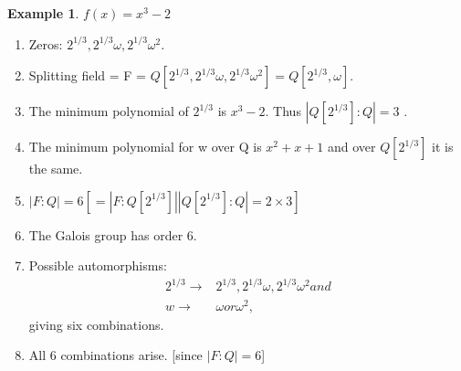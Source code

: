 \documentclass[12pt]{article}
\theoremstyle{definition}
\newtheorem{exmp}[thm]{Example}
\theoremstyle{remark}
\begin{document}
\begin{exmp}
$f(x) = x^{3} - 2$
\begin{enumerate}
  \item  Zeros: $2^{1/3}, 2^{1/3}\omega, 2^{1/3}\omega^{2}$.
  \item  Splitting field = F = $Q[2^{1/3}, 2^{1/3}\omega, 2^{1/3}\omega^{2}] = Q[2^{1/3}, \omega]$.
  \item The minimum polynomial of $2^{1/3}$ is $x^{3} - 2$. Thus $|Q[2^{1/3}]:Q| = 3$ .
  \item The minimum polynomial for w over Q is $x^{2} + x +1$ and over $Q[2^{1/3}]$ it is the same.
  \item $|F:Q| = 6 [= |F:Q[2^{1/3}]| |Q[2^{1/3}]:Q| =2\times3]$
  \item The Galois group has order 6.
  \item Possible automorphisms:
  \begin{align*}
   2^{1/3}\rightarrow & 2^{1/3}, 2^{1/3}\omega, 2^{1/3}\omega^{2} and\\
   w\rightarrow&\omega or \omega^{2},
  \end{align*}
  giving six combinations.
  \item All 6 combinations arise. [since $|F:Q| = 6$]
\end{enumerate}
\end{exmp}
\end{document}
